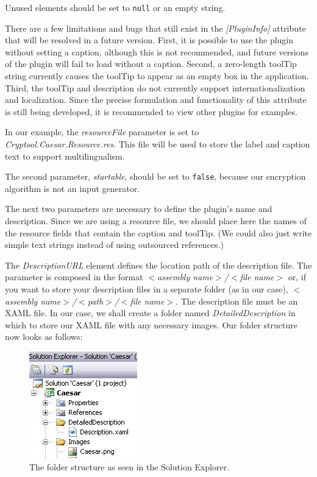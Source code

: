\noindent Unused elements should be set to \texttt{null} or an empty string.

There are a few limitations and bugs that still exist in the \textit{[PluginInfo]} attribute that will be resolved in a future version. First, it is possible to use the plugin without setting a caption, although this is not recommended, and future versions of the plugin will fail to load without a caption. Second, a zero-length toolTip string currently causes the toolTip to appear as an empty box in the application. Third, the toolTip and description do not currently support internationalization and localization. Since the precise formulation and functionality of this attribute is still being developed, it is recommended to view other plugins for examples.

In our example, the \textit{resourceFile} parameter is set to \textit{Cryptool.Caesar.Resource.res}. This file will be used to store the label and caption text to support multilingualism.

The second parameter, \textit{startable}, should be set to \texttt{false}, because our encryption algorithm is not an input generator.

The next two parameters are necessary to define the plugin's name and description. Since we are using a resource file, we should place here the names of the resource fields that contain the caption and toolTip. (We could also just write simple text strings instead of using outsourced references.)

The \textit{DescriptionURL} element defines the location path of the description file. The parameter is composed in the format \textit{$<$assembly name$>$/$<$file name$>$} or, if you want to store your description files in a separate folder (as in our case), \textit{$<$assembly name$>$/$<$path$>$/$<$file name$>$}. The description file must be an XAML file. In our case, we shall create a folder named \textit{DetailedDescription} in which to store our XAML file with any necessary images. Our folder structure now looks as follows:

\begin{figure}[h!]
	\centering
		\includegraphics[width=.30\textwidth]{figures/detailed_description.jpg}
	\caption{The folder structure as seen in the Solution Explorer.}
	\label{fig:attribute_plugininfo_icon_path}
\end{figure}

